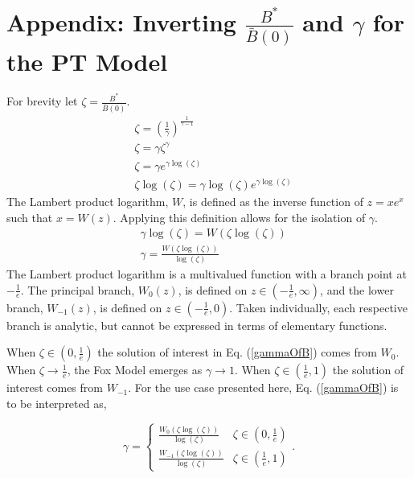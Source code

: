 \documentclass[12pt]{article}
\begin{document}
\section{Appendix\label{lambApp}: Inverting $\frac{B^*}{\bar B(0)}$ and $\gamma$ for the PT Model}
For brevity let $\zeta=\frac{B^*}{\bar B(0)}$.
\begin{align*}
&\zeta=\left(\frac{1}{\gamma}\right)^{\frac{1}{\gamma-1}}\\
&\zeta=\gamma\zeta^{\gamma}\\
&\zeta=\gamma e^{\gamma\log(\zeta)}\\
&\zeta\log(\zeta)=\gamma\log(\zeta) e^{\gamma\log(\zeta)}
\end{align*}
The Lambert product logarithm, $W$, is defined as the inverse function of $z=xe^x$ such that $x=W(z)$. 
Applying this definition allows for the isolation of $\gamma$.
\begin{align}
&\gamma\log(\zeta)=W\left(\zeta\log(\zeta)\right) \nonumber\\
&\gamma=\frac{W\left(\zeta\log(\zeta)\right)}{\log(\zeta)} \label{gammaOfZeta}
\end{align}
The Lambert product logarithm is a multivalued function with a branch point at 
$-\frac{1}{e}$. The principal branch, $W_0(z)$, is defined on $z\in\left(-\frac{1}{e}, \infty\right)$, 
and the lower branch, $W_{-1}(z)$, is defined on $z\in\left(-\frac{1}{e}, 0\right)$. Taken 
individually, each respective branch is analytic, but cannot be expressed in terms 
of elementary functions.

%
When $\zeta\in\left(0, \frac{1}{e}\right)$ the solution of interest in Eq. (\ref{gammaOfB}) 
comes from $W_0$. %
When $\zeta\to\frac{1}{e}$, the Fox Model emerges as $\gamma\to1$.
When $\zeta\in\left(\frac{1}{e}, 1\right)$ the solution of interest comes from 
$W_{-1}$. For the use case presented here, Eq. (\ref{gammaOfB}) is to be interpreted as,

\begin{equation}
\gamma = 
\begin{cases} 
\frac{W_0\left(\zeta\log\left(\zeta\right)\right)}{\log\left(\zeta\right)} & \zeta\in\left(0, \frac{1}{e}\right)\\
\frac{W_{-1}\left(\zeta\log\left(\zeta\right)\right)}{\log\left(\zeta\right)} & \zeta\in\left(\frac{1}{e}, 1\right)
\end{cases}. 
\end{equation} 
\end{document}
